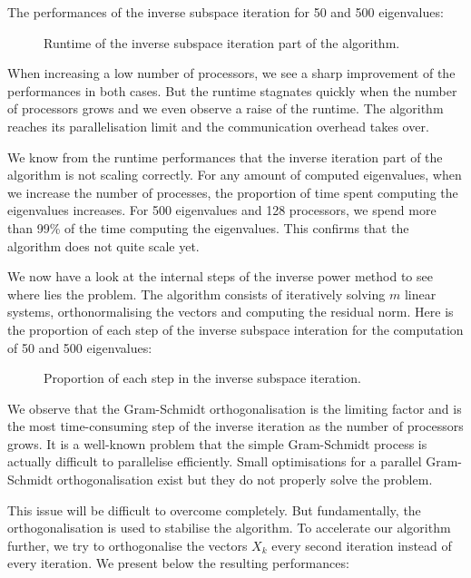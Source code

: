 The performances of the inverse subspace iteration for 50 and 500 eigenvalues:

\begin{figure}[H]
  \centering
  
  \caption{Runtime of the inverse subspace iteration part of the algorithm.}
\end{figure}

When increasing a low number of processors, we see a sharp improvement of the performances in both cases.
But the runtime stagnates quickly when the number of processors grows and we even observe a raise of the runtime.
The algorithm reaches its parallelisation limit and the communication overhead takes over.

We know from the runtime performances that the inverse iteration part of the algorithm is not scaling correctly.
For any amount of computed eigenvalues, when we increase the number of processes, the proportion of time spent computing the eigenvalues increases.
For 500 eigenvalues and 128 processors, we spend more than 99\% of the time computing the eigenvalues.
This confirms that the algorithm does not quite scale yet.

We now have a look at the internal steps of the inverse power method to see where lies the problem.
The algorithm consists of iteratively solving \(m\) linear systems, orthonormalising the vectors and computing the residual norm.
Here is the proportion of each step of the inverse subspace interation for the computation of 50 and 500 eigenvalues:

\begin{figure}[H]
  \centering
  
  \caption{Proportion of each step in the inverse subspace iteration.}
\end{figure}

We observe that the Gram-Schmidt orthogonalisation is the limiting factor and is the most time-consuming step of the inverse iteration as the number of processors grows.
It is a well-known problem that the simple Gram-Schmidt process is actually difficult to parallelise efficiently.
Small optimisations for a parallel Gram-Schmidt orthogonalisation exist \cite{katagiri_parallel_gram_schmidt_2003} but they do not properly solve the problem.

This issue will be difficult to overcome completely.
But fundamentally, the orthogonalisation is used to stabilise the algorithm.
To accelerate our algorithm further, we try to orthogonalise the vectors \(X_k\) every second iteration instead of every iteration.
We present below the resulting performances:

